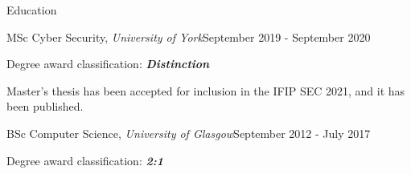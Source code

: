 \documentclass{resume}
\begin{document}
\begin{rSection}{Education}

\begin{rSubsection}{MSc Cyber Security, \textit{University of York}}{September 2019 - September 2020}{}{}
\item Degree award classification: \textbf{\textit{Distinction}}    
    \item Master's thesis has been accepted for inclusion in the IFIP SEC 2021, and it has been published.
\end{rSubsection}

\begin{rSubsection}{BSc Computer Science, \textit{University of Glasgow}}{September 2012 - July 2017}{}{}
    \item Degree award classification: \textbf{\textit{2:1}}
\end{rSubsection}

\end{rSection}
\end{document}
